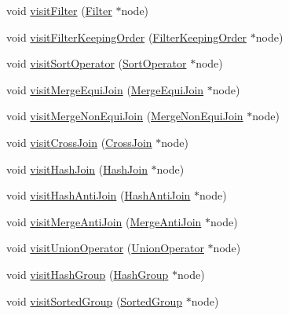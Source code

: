 \begin{DoxyCompactItemize}
\item 
void \hyperlink{class_cloning_physical_operator_visitor_ac1b811ff2fd316b05d64f85c2e87fd9c}{visit\+Filter} (\hyperlink{class_filter}{Filter} $\ast$node)
\item 
void \hyperlink{class_cloning_physical_operator_visitor_a41aff61c8da3a7b88beddb6aaffb211e}{visit\+Filter\+Keeping\+Order} (\hyperlink{class_filter_keeping_order}{Filter\+Keeping\+Order} $\ast$node)
\item 
void \hyperlink{class_cloning_physical_operator_visitor_a5bb911312d752fcc31b48bb21f658bdf}{visit\+Sort\+Operator} (\hyperlink{class_sort_operator}{Sort\+Operator} $\ast$node)
\item 
void \hyperlink{class_cloning_physical_operator_visitor_ae1eb095ee91c30030c7830a9b999a6ec}{visit\+Merge\+Equi\+Join} (\hyperlink{class_merge_equi_join}{Merge\+Equi\+Join} $\ast$node)
\item 
void \hyperlink{class_cloning_physical_operator_visitor_a6b17fd37e070917db7152f869517eb4a}{visit\+Merge\+Non\+Equi\+Join} (\hyperlink{class_merge_non_equi_join}{Merge\+Non\+Equi\+Join} $\ast$node)
\item 
void \hyperlink{class_cloning_physical_operator_visitor_aa48e6141645ce53d8cae2b1678fdc2d4}{visit\+Cross\+Join} (\hyperlink{class_cross_join}{Cross\+Join} $\ast$node)
\item 
void \hyperlink{class_cloning_physical_operator_visitor_abb1f8426172480eb5968abd7f9deb541}{visit\+Hash\+Join} (\hyperlink{class_hash_join}{Hash\+Join} $\ast$node)
\item 
void \hyperlink{class_cloning_physical_operator_visitor_a661c04bfbdf0d36e745fc82bf8f8a193}{visit\+Hash\+Anti\+Join} (\hyperlink{class_hash_anti_join}{Hash\+Anti\+Join} $\ast$node)
\item 
void \hyperlink{class_cloning_physical_operator_visitor_af32410ddcbf200eb102bbe8ad5ad1859}{visit\+Merge\+Anti\+Join} (\hyperlink{class_merge_anti_join}{Merge\+Anti\+Join} $\ast$node)
\item 
void \hyperlink{class_cloning_physical_operator_visitor_af9199524feba8c12ceff7d78c1915064}{visit\+Union\+Operator} (\hyperlink{class_union_operator}{Union\+Operator} $\ast$node)
\item 
void \hyperlink{class_cloning_physical_operator_visitor_aa3a6b9d8327700089089e57e18861d6d}{visit\+Hash\+Group} (\hyperlink{class_hash_group}{Hash\+Group} $\ast$node)
\item 
void \hyperlink{class_cloning_physical_operator_visitor_a464894a18b7194c57e0c8d16f901ff5b}{visit\+Sorted\+Group} (\hyperlink{class_sorted_group}{Sorted\+Group} $\ast$node)

\end{DoxyCompactItemize}
